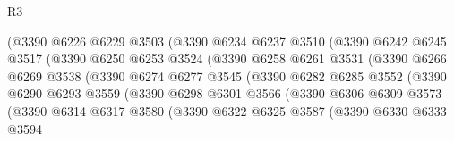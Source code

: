 \begin{lexlean}{R3}
\begin{coremodule}
                          (@3390
                            @6226
                            @6229
                            @3503
                            (@3390
                              @6234
                              @6237
                              @3510
                              (@3390
                                @6242
                                @6245
                                @3517
                                (@3390
                                  @6250
                                  @6253
                                  @3524
                                  (@3390
                                    @6258
                                    @6261
                                    @3531
                                    (@3390
                                      @6266
                                      @6269
                                      @3538
                                      (@3390
                                        @6274
                                        @6277
                                        @3545
                                        (@3390
                                          @6282
                                          @6285
                                          @3552
                                          (@3390
                                            @6290
                                            @6293
                                            @3559
                                            (@3390
                                              @6298
                                              @6301
                                              @3566
                                              (@3390
                                                @6306
                                                @6309
                                                @3573
                                                (@3390
                                                  @6314
                                                  @6317
                                                  @3580
                                                  (@3390
                                                    @6322
                                                    @6325
                                                    @3587
                                                    (@3390
                                                      @6330
                                                      @6333
                                                      @3594

\end{coremodule}
\end{lexlean}
